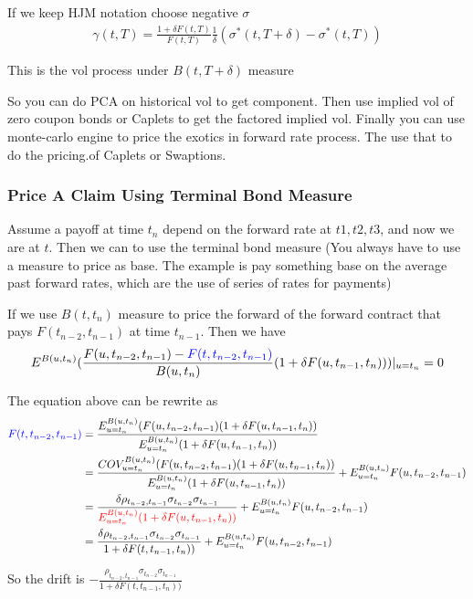 {\color{blue}If we keep HJM notation choose negative $\sigma$}
\begin{equation}
\begin{aligned}
\gamma(t, T) = \frac{1 + \delta F(t, T) }{F(t, T)} \frac{1}{\delta} ( \sigma^\ast(t, T+\delta) -\sigma^\ast(t, T) )
\end{aligned}
\end{equation}

This is the vol process under $B(t, T + \delta)$ measure

So you can do PCA on historical vol to get component. Then use implied vol of zero coupon bonds or Caplets to get the factored implied vol. Finally you can use monte-carlo engine to price the exotics in forward rate process. The use that to do the pricing.of Caplets or Swaptions.

\subsubsection{Price A Claim Using Terminal Bond Measure}

Assume a payoff at time $t_n$ depend on the forward rate at $t1, t2, t3$, and now we are at $t$. Then we can to use the terminal bond measure {\color{blue} (You always have to use a measure to price as base. The example is pay something base on the average past forward rates, which are the use of series of rates for payments)}

If we use  $B(t, t_n)$ measure to price the forward of the forward contract that pays $F(t_{n-2}, t_{n-1})$ at time $t_{n-1}$. Then we have 
\begin{equation}
\begin{aligned}
E^{B(u, t_n)} (\frac{F(u, t_{n-2}, t_{n-1}) - {\color{blue}F(t, t_{n-2}, t_{n-1})}}{B(u, t_n)} (1 + \delta F(u, t_{n-1}, t_{n}))) |_{u=t_n}= 0 
\end{aligned}
\end{equation}

The equation above can be rewrite as
\begin{equation}
\begin{aligned}
{\color{blue}F(t, t_{n-2}, t_{n-1})} &= \frac{E^{B(u, t_n)}_{u=t_n} (F(u, t_{n-2}, t_{n-1}) (1 + \delta F(u, t_{n-1}, t_{n}))}{E^{B(u, t_n)}_{u=t_n}(1 + \delta F(u, t_{n-1}, t_{n}))} \\ 
&= \frac{COV^{B(u, t_n)}_{u=t_n} (F(u, t_{n-2}, t_{n-1}) (1 + \delta F(u, t_{n-1}, t_{n}))}{E^{B(u, t_n)}_{u=t_n}(1 + \delta F(u, t_{n-1}, t_{n}))} + E^{B(u, t_n)}_{u=t_n}F(u, t_{n-2}, t_{n-1})\\ 
&= \frac{\delta\rho_{t_{n-2}, t_{n-1}}\sigma_{t_{n-2}}\sigma_{t_{n-1}}}{\color{red}E^{B(u, t_n)}_{u=t_n}(1 + \delta F(u, t_{n-1}, t_{n}))} + E^{B(u, t_n)}_{u=t_n}F(u, t_{n-2}, t_{n-1}) \\
&= \frac{\delta\rho_{t_{n-2}, t_{n-1}}\sigma_{t_{n-2}}\sigma_{t_{n-1}}}{1 + \delta F(t, t_{n-1}, t_{n}))} + E^{B(u, t_n)}_{u=t_n}F(u, t_{n-2}, t_{n-1})
\end{aligned}
\end{equation}

So the drift is $ -\frac{\rho_{t_{n-2}, t_{n-1}}\sigma_{t_{n-2}}\sigma_{t_{n-1}}}{1 + \delta F(t, t_{n-1}, t_{n}))} $


